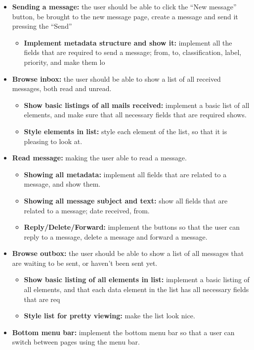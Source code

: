 \begin{itemize}
\item{}\textbf{Sending a message:} the user should be able to click the “New message” button, be brought to the new message page, create a message and send it pressing the “Send”
\begin{itemize}
\item{}\textbf{Implement metadata structure and show it:} implement all the fields that are required to send a message; from, to, classification, label, priority, and make them lo
\end{itemize}
\item{}\textbf{Browse inbox:} the user should be able to show a list of all received messages, both read and unread.
\begin{itemize}
\item{}\textbf{Show basic listings of all mails received:} implement a basic list of all elements, and make sure that all necessary fields that are required shows.
\item{}\textbf{Style elements in list:} style each element of the list, so that it is pleasing to look at.
\end{itemize}
\item{}\textbf{Read message:} making the user able to read a message.
\begin{itemize}
\item{}\textbf{Showing all metadata:} implement all fields that are related to a message, and show them.
\item{}\textbf{Showing all message subject and text:} show all fields that are related to a message; date received, from.
\item{}\textbf{Reply/Delete/Forward:} implement the buttons so that the user can reply to a message, delete a message and forward a message.
\end{itemize}
\item{}\textbf{Browse outbox:} the user should be able to show a list of all messages that are waiting to be sent, or haven’t been sent yet.
\begin{itemize}
\item{}\textbf{Show basic listing of all elements in list:} implement a basic listing of all elements, and that each data element in the list has all necessary fields that are req
\item{}\textbf{Style list for pretty viewing:} make the list look nice.
\end{itemize}
\item{}\textbf{Bottom menu bar:} implement the bottom menu bar so that a user can switch between pages using the menu bar.

\end{itemize}
